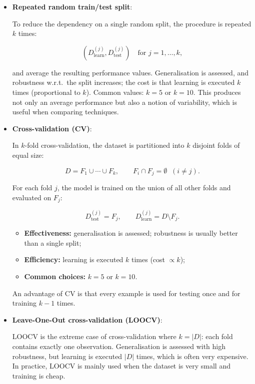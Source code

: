 \begin{itemize}[itemsep=0.4em]
\item \textbf{Repeated random train/test split}: 

To reduce the dependency on a single random split, the procedure is repeated $k$ times:

$$
(D_{\text{learn}}^{(j)}, D_{\text{test}}^{(j)}) \quad \text{for } j=1,\dots,k,
$$

and average the resulting performance values. Generalisation is assessed, and robustness w.r.t.\ the split increases; the cost is that learning is executed $k$ times (proportional to $k$). Common values: $k = 5$ or $k = 10$. This produces not only an average performance but also a notion of variability, which is useful when comparing techniques.

\item \textbf{Cross-validation (CV)}:

In $k$-fold cross-validation, the dataset is partitioned into $k$ disjoint folds of equal size:

$$
D = F_1 \cup \cdots \cup F_k,
\qquad
F_i \cap F_j = \emptyset \;\; (i \neq j).
$$

For each fold $j$, the model is trained on the union of all other folds and evaluated on $F_j$:

$$
D_{\text{test}}^{(j)} = F_j,
\qquad
D_{\text{learn}}^{(j)} = D \setminus F_j.
$$

\begin{definitionblock}
\begin{itemize}
    \item \textbf{Effectiveness:} generalisation is assessed; robustness is usually better than a single split;
    \item \textbf{Efficiency:} learning is executed $k$ times (cost $\propto k$);
    \item \textbf{Common choices:} $k = 5$ or $k = 10$.
\end{itemize}
\end{definitionblock}

An advantage of CV is that every example is used for testing once and for training $k-1$ times.

\item \textbf{Leave-One-Out cross-validation (LOOCV)}: 

LOOCV is the extreme case of cross-validation where $k = |D|$: each fold contains exactly one observation. Generalisation is assessed with high robustness, but learning is executed $|D|$ times, which is often very expensive. In practice, LOOCV is mainly used when the dataset is very small and training is cheap.
\end{itemize}

